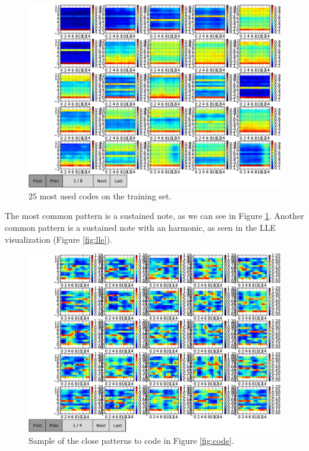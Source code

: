 \documentclass{article}
\begin{document}
\begin{figure}[htb]
\begin{center}
\includegraphics[width=.9\columnwidth]{codes1}
\end{center}
\caption{{$25$ most used codes on the training set.}}
\label{fig:firstcodes}
\end{figure}

The most common pattern is a sustained note, as we can see in Figure
\ref{fig:firstcodes}. Another common pattern is a sustained note
with an harmonic, as seen in the LLE visualization (Figure \ref{fig:lle}).

\begin{figure}[htb]
\begin{center}
\includegraphics[width=.9\columnwidth]{close_patterns1}
\end{center}
\caption{{Sample of the close patterns to code in Figure \ref{fig:code}.}}
\label{fig:closep}
\end{figure}
\end{document}
